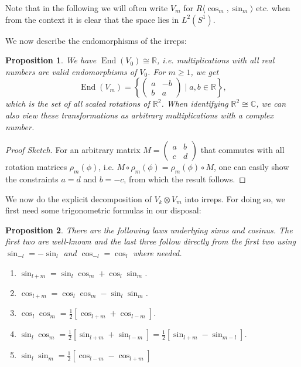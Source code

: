 \documentclass[12pt, a4paper]{article}
\theoremstyle{plain}
\newtheorem{pro}{Proposition}[section]
\theoremstyle{definition}
\theoremstyle{remark}
\newcommand{\R}{\mathds{R}}
\newcommand{\C}{\mathds{C}}
\DeclareMathOperator{\End}{End}
\begin{document}
Note that in the following we will often write $V_m$ for $R \langle \cos_m, \sin_m \rangle$ etc. when from the context it is clear that the space lies in $L^2(S^1)$.

We now describe the endomorphisms of the irreps:

\begin{pro}\label{endomorphisms}
We have $\End(V_0) \cong \R$, i.e. multiplications with all real numbers are valid endomorphisms of $V_0$. For $m \geq 1$, we get
\begin{equation*}
\End(V_m) = \left\lbrace \begin{pmatrix} a & -b \\ b & a \end{pmatrix} \mid a, b \in \R \right\rbrace,
\end{equation*}
which is the set of all scaled rotations of $\R^2$. When identifying $\R^2 \cong \C$, we can also view these transformations as arbitrary multiplications with a complex number.
\end{pro}

\begin{proof}[Proof Sketch]
For an arbitrary matrix $M = \begin{pmatrix} a & b \\ c & d\end{pmatrix}$ that commutes with all rotation matrices $\rho_m(\phi)$, i.e. $M \circ \rho_m(\phi) = \rho_m(\phi) \circ M$, one can easily show the constraints $a = d$ and $b = -c$, from which the result follows. 
\end{proof}

We now do the explicit decomposition of $V_k \otimes V_m$ into irreps. For doing so, we first need some trigonometric formulas in our disposal:

\begin{pro}\label{trigonometric formulas}
There are the following laws underlying sinus and cosinus. The first two are well-known and the last three follow directly from the first two using $\sin_{-l} = - \sin_l$ and $\cos_{-l} = \cos_l$ where needed.
\begin{enumerate}
\item $\sin_{l+m} = \sin_l \cos_m + \cos_l \sin_m$.
\item $\cos_{l+m} = \cos_l\cos_m - \sin_l \sin_m$.
\item $\cos_l \cos_m = \frac{1}{2} \left[ \cos_{l+m} + \cos_{l-m} \right]$.
\item $\sin_l \cos_m = \frac{1}{2} \left[  \sin_{l+m} + \sin_{l-m} \right] = \frac{1}{2} \left[ \sin_{l+m} - \sin_{m - l}\right]$.
\item $\sin_l \sin_m = \frac{1}{2} \left[ \cos_{l-m} - \cos_{l+m} \right]$
\end{enumerate}
\end{pro}
\end{document}
